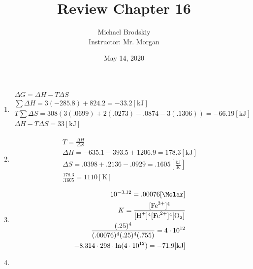 \documentclass[12pt]{article}
\title{Review Chapter 16}
\date{May 14, 2020}
\author{Michael Brodskiy\\ \small Instructor: Mr. Morgan}
\begin{document}
\maketitle

\begin{enumerate}

  \item

    \begin{equation}
      \begin{split}
        \Delta G=\Delta H-T\Delta S\\
        \sum \Delta H= 3(-285.8)+824.2=-33.2[\si{\kilo\joule}]\\
        T\sum \Delta S= 308(3(.0699)+2(.0273)-.0874-3(.1306))=-66.19[\si{\kilo\joule}]\\
        \Delta H-T\Delta S=33[\si{\kilo\joule}]
      \end{split}
      \label{1}
    \end{equation}

  \item

    \begin{equation}
      \begin{split}
        T=\frac{\Delta H}{\Delta S}\\
        \Delta H= -635.1-393.5+1206.9=178.3[\si{\kilo\joule}]\\
        \Delta S= .0398+.2136-.0929=.1605\left[ \frac{\si{\kilo\joule}}{\si{\kelvin}} \right]\\
        \frac{178.3}{.1605}=1110[\si{\kelvin}]
      \end{split}
      \label{2}
    \end{equation}

  \item

    \begin{equation}
      \begin{split}
        10^{-3.12}=.00076[\si{\Molar}]\\
        K=\frac{[\ce{Fe^3+}]^4}{[\ce{H+}]^4[\ce{Fe^2+}]^4[\ce{O2}]}\\
        \frac{(.25)^4}{(.00076)^4(.25)^4(.755)}=4\cdot10^{12}\\
        -8.314\cdot298\cdot\ln(4\cdot10^{12})=-71.9[\si{\kilo\joule}]
      \end{split}
      \label{3}
    \end{equation}

  \item


\end{enumerate}
\end{document}
